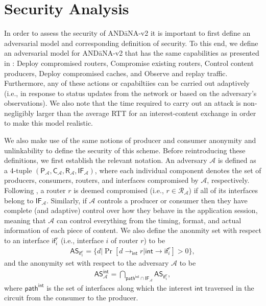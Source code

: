 \section{Security Analysis} \label{sec:security}
In order to assess the security of {\sf AND\=aNA-v2} it is important to first define an adversarial model and corresponding definition of security. To this end, we define an adversarial model for {\sf AND\=aNA-v2} that has the same capabilities as presented in \cite{andana}: Deploy compromised routers, Compromise existing routers, Control content producers, Deploy compromised caches, and Observe and replay traffic. Furthermore, any of these actions or capabiltiies can be carried out adaptively (i.e., in response to status updates from the network or based on the adversary's observations). We also note that the time required to carry out an attack is non-negligibly larger than the average RTT for an interest-content exchange in order to make this model realistic. 

We also make use of the same notions of producer and consumer anonymity and unlinkability to define the security of this scheme. Before reintroducing these definitions, we first establish the relevant notation. An adversary $\mathcal{A}$ is defined as a 4-tuple $(\mathsf{P}_{\mathcal{A}}, \mathsf{C}_{\mathcal{A}}, \mathsf{R}_{\mathcal{A}}, \mathsf{IF}_{\mathcal{A}})$, where each individual component denotes the set of producers, consumers, routers, and interfaces compromised by $\mathcal{A}$, respectively. Following \cite{andana}, a router $r$ is deemed compromised (i.e., $r \in \mathcal{R}_{\mathcal{A}}$) if all of its interfaces belong to $\mathsf{IF}_{\mathcal{A}}$. Similarly, if $\mathcal{A}$ controls a producer or consumer then they have complete (and adaptive) control over how they behave in the application session, meaning that $\mathcal{A}$ can control everything from the timing, format, and actual information of each piece of content. We also define the anonmity set with respect to an interface $\mathsf{if}_i^r$ (i.e., interface $i$ of router $r$) to be 
\begin{align*}
\mathsf{AS}_{\mathsf{if}_{i}^{r}} = \{d | \Pr[d \to_\mathsf{int} r | \mathsf{int} \to \mathsf{if}_i^r] > 0 \},
\end{align*}
and the anonymity set with respect to the adversary $\mathcal{A}$ to be
\begin{align*}
\mathsf{AS}_{\mathcal{A}}^{\mathsf{int}} = \bigcap_{\mathsf{path}^{\mathsf{int}} \cap \mathsf{IF}_{\mathcal{A}}} \mathsf{AS}_{\mathsf{if}_{i}^{r}},
\end{align*}
where $\mathsf{path}^{\mathsf{int}}$ is the set of interfaces along which the interest $\mathsf{int}$ traversed in the circuit from the consumer to the producer. 

